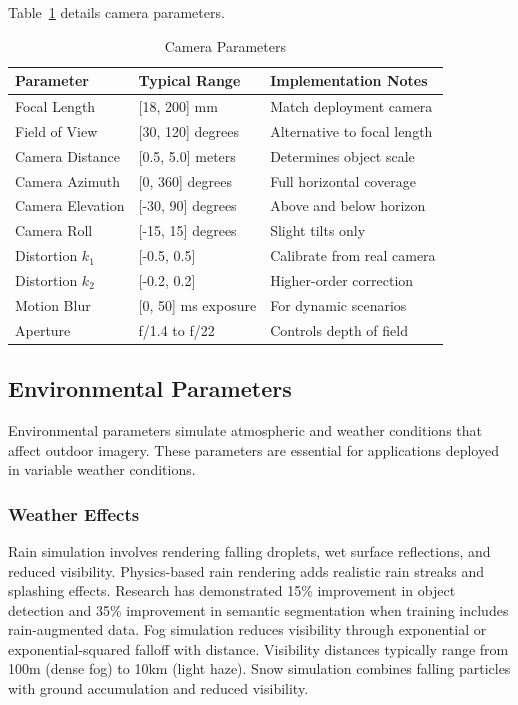 Table~\ref{tab:camera_params} details camera parameters.

\begin{table}[htbp]
\centering
\caption{Camera Parameters}
\label{tab:camera_params}
\begin{tabular}{p{3.5cm}p{3cm}p{5cm}}
\hline
\textbf{Parameter} & \textbf{Typical Range} & \textbf{Implementation Notes} \\
\hline
Focal Length & [18, 200] mm & Match deployment camera \\
Field of View & [30, 120] degrees & Alternative to focal length \\
Camera Distance & [0.5, 5.0] meters & Determines object scale \\
Camera Azimuth & [0, 360] degrees & Full horizontal coverage \\
Camera Elevation & [-30, 90] degrees & Above and below horizon \\
Camera Roll & [-15, 15] degrees & Slight tilts only \\
Distortion $k_1$ & [-0.5, 0.5] & Calibrate from real camera \\
Distortion $k_2$ & [-0.2, 0.2] & Higher-order correction \\
Motion Blur & [0, 50] ms exposure & For dynamic scenarios \\
Aperture & f/1.4 to f/22 & Controls depth of field \\
\hline
\end{tabular}
\end{table}

\subsection{Environmental Parameters}

Environmental parameters simulate atmospheric and weather conditions that affect outdoor imagery. These parameters are essential for applications deployed in variable weather conditions.

\subsubsection{Weather Effects}

Rain simulation involves rendering falling droplets, wet surface reflections, and reduced visibility. Physics-based rain rendering adds realistic rain streaks and splashing effects. Research has demonstrated 15\% improvement in object detection and 35\% improvement in semantic segmentation when training includes rain-augmented data. Fog simulation reduces visibility through exponential or exponential-squared falloff with distance. Visibility distances typically range from 100m (dense fog) to 10km (light haze). Snow simulation combines falling particles with ground accumulation and reduced visibility.

